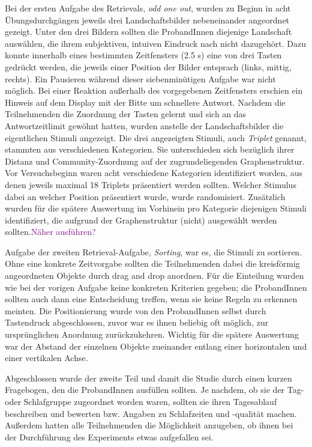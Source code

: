 Bei der ersten Aufgabe des Retrievals, \textit{odd one out}, wurden zu Beginn in acht Übungsdurchgängen jeweils drei Landschaftsbilder nebeneinander angeordnet gezeigt. Unter den drei Bildern sollten die ProbandInnen diejenige Landschaft auswählen, die ihrem subjektiven, intuiven Eindruck nach nicht dazugehört. Dazu konnte innerhalb eines bestimmten Zeitfensters (2.5 s) eine von drei Tasten gedrückt werden, die jeweils einer Position der Bilder entsprach (links, mittig, rechts). Ein Pausieren während dieser siebenminütigen Aufgabe war nicht möglich. Bei einer Reaktion außerhalb des vorgegebenen Zeitfensters erschien ein Hinweis auf dem Display mit der Bitte um schnellere Antwort. Nachdem die Teilnehmenden die Zuordnung der Tasten gelernt und sich an das Antwortzeitlimit gewöhnt hatten, wurden anstelle der Landschaftsbilder die eigentlichen Stimuli angezeigt. Die drei angezeigten Stimuli, auch \textit{Triplet} genannt, stammten aus verschiedenen Kategorien. Sie unterschieden sich bezüglich ihrer Distanz und Community-Zuordnung auf der zugrundeliegenden Graphenstruktur. Vor Versuchsbeginn waren acht verschiedene Kategorien identifiziert worden, aus denen jeweils maximal 18 Triplets präsentiert werden sollten. Welcher Stimulus dabei an welcher Position präsentiert wurde, wurde randomisiert. Zusätzlich wurden für die spätere Auswertung im Vorhinein pro Kategorie diejenigen Stimuli identifiziert, die aufgrund der Graphenstruktur (nicht) ausgewählt werden sollten.\textcolor{purple}{Näher ausführen?}

Aufgabe der zweiten Retrieval-Aufgabe, \textit{Sorting}, war es, die Stimuli zu sortieren. Ohne eine konkrete Zeitvorgabe sollten die Teilnehmenden dabei die kreisförmig angeordneten Objekte durch drag and drop anordnen. Für die Einteilung wurden wie bei der vorigen Aufgabe keine konkreten Kriterien gegeben; die ProbandInnen sollten auch dann eine Entscheidung treffen, wenn sie keine Regeln zu erkennen meinten. Die Positionierung wurde von den ProbandInnen selbst durch Tastendruck abgeschlossen, zuvor war es ihnen beliebig oft möglich, zur ursprünglichen Anordnung zurückzukehren. Wichtig für die spätere Auswertung war der Abstand der einzelnen Objekte zueinander entlang einer horizontalen und einer vertikalen Achse.

Abgeschlossen wurde der zweite Teil und damit die Studie durch einen kurzen Fragebogen, den die ProbandInnen ausfüllen sollten. Je nachdem, ob sie der Tag- oder Schlafgruppe zugeordnet worden waren, sollten sie ihren Tagesablauf beschreiben und bewerten bzw. Angaben zu Schlafzeiten und -qualität machen. Außerdem hatten alle Teilnehmenden die Möglichkeit anzugeben, ob ihnen bei der Durchführung des Experiments etwas aufgefallen sei.

